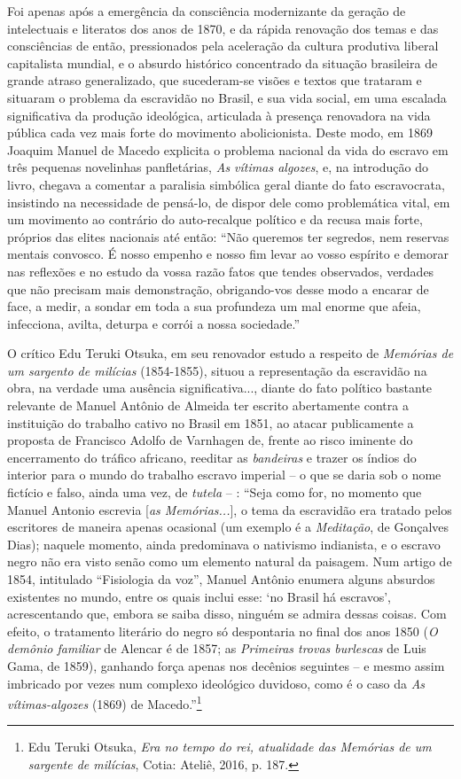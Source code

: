 Foi apenas após a emergência da consciência modernizante da geração de
intelectuais e literatos dos anos de 1870, e da rápida renovação dos
temas e das consciências de então, pressionados pela aceleração da
cultura produtiva liberal capitalista mundial, e o absurdo histórico
concentrado da situação brasileira de grande atraso generalizado, que
sucederam-se visões e textos que trataram e situaram o problema da
escravidão no Brasil, e sua vida social, em uma escalada significativa
da produção ideológica, articulada à presença renovadora na vida pública
cada vez mais forte do movimento abolicionista. Deste modo, em 1869
Joaquim Manuel de Macedo explicita o problema nacional da vida do
escravo em três pequenas novelinhas panfletárias, \emph{As vítimas
algozes}, e, na introdução do livro, chegava a comentar a paralisia
simbólica geral diante do fato escravocrata, insistindo na necessidade
de pensá-lo, de dispor dele como problemática vital, em um movimento ao
contrário do auto-recalque político e da recusa mais forte, próprios das
elites nacionais até então: ``Não queremos ter segredos, nem reservas
mentais convosco. É nosso empenho e nosso fim levar ao vosso espírito e
demorar nas reflexões e no estudo da vossa razão fatos que tendes
observados, verdades que não precisam mais demonstração, obrigando-vos
desse modo a encarar de face, a medir, a sondar em toda a sua profundeza
um mal enorme que afeia, infecciona, avilta, deturpa e corrói a nossa
sociedade.''

O crítico Edu Teruki Otsuka, em seu renovador estudo a respeito de
\emph{Memórias de um sargento de milícias} (1854-1855), situou a
representação da escravidão na obra, na verdade uma ausência
significativa..., diante do fato político bastante relevante de Manuel
Antônio de Almeida ter escrito abertamente contra a instituição do
trabalho cativo no Brasil em 1851, ao atacar publicamente a proposta de
Francisco Adolfo de Varnhagen de, frente ao risco iminente do
encerramento do tráfico africano, reeditar as \emph{bandeiras} e trazer
os índios do interior para o mundo do trabalho escravo imperial -- o que
se daria sob o nome fictício e falso, ainda uma vez, de \emph{tutela} --
: ``Seja como for, no momento que Manuel Antonio escrevia {[}\emph{as
Memórias...}{]}, o tema da escravidão era tratado pelos escritores de
maneira apenas ocasional (um exemplo é a \emph{Meditação}, de Gonçalves
Dias); naquele momento, ainda predominava o nativismo indianista, e o
escravo negro não era visto senão como um elemento natural da paisagem.
Num artigo de 1854, intitulado ``Fisiologia da voz'', Manuel Antônio
enumera alguns absurdos existentes no mundo, entre os quais inclui esse:
`no Brasil há escravos', acrescentando que, embora se saiba disso,
ninguém se admira dessas coisas. Com efeito, o tratamento literário do
negro só despontaria no final dos anos 1850 (\emph{O demônio familiar}
de Alencar é de 1857; as \emph{Primeiras trovas burlescas} de Luis Gama,
de 1859), ganhando força apenas nos decênios seguintes -- e mesmo assim
imbricado por vezes num complexo ideológico duvidoso, como é o caso da
\emph{As vítimas-algozes} (1869) de Macedo.''\footnote{Edu Teruki
  Otsuka, \emph{Era no tempo do rei, atualidade das Memórias de um
  sargente de milícias}, Cotia: Ateliê, 2016, p. 187.}

